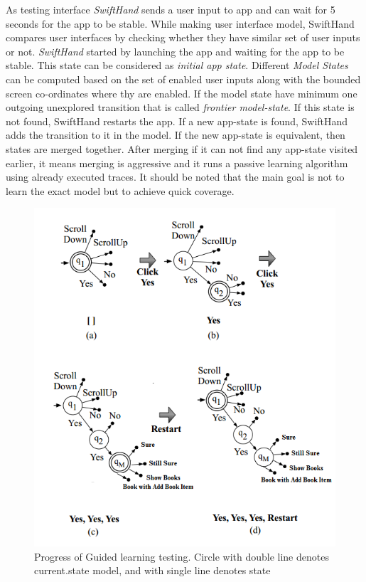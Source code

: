 \documentclass[authoryear,preprint, twocolumn]{sigplanconf}
\begin{document}
\newline As testing interface \emph{SwiftHand} sends a user input to app and can wait for 5 seconds for the app to be stable. While making user interface model, SwiftHand  compares user interfaces by checking whether they have similar set of user inputs or not.
\newline \emph{SwiftHand} started by launching the app and waiting for the app to be stable. This state can be considered as \emph{initial app state}. Different \emph{Model States} can be computed based on the set of enabled user inputs along with the bounded screen co-ordinates where thy are enabled. If the model state have minimum one outgoing unexplored transition that is called \emph{frontier model-state}. If this state is not found, SwiftHand restarts the app. If a new app-state is found, SwiftHand adds the transition to it in the model. If the new app-state is equivalent, then states are merged together. After merging if it can not find any app-state visited earlier, it means merging is aggressive and it runs a passive learning algorithm using already executed traces. It should be noted that the main goal is not to learn the exact model but to achieve quick coverage.

\begin{figure}[ht]
	\centering
	\includegraphics[width=1.0\linewidth]{figures/swifthand2}
	\caption[Progress of Guided learning testing. Circle with double line denotes current.state model, and with single line denotes state]{\label{f:guidedtestingmodel}Progress of Guided learning testing. Circle with double line denotes current.state model, and with single line denotes state}
\end{figure}
\end{document}
